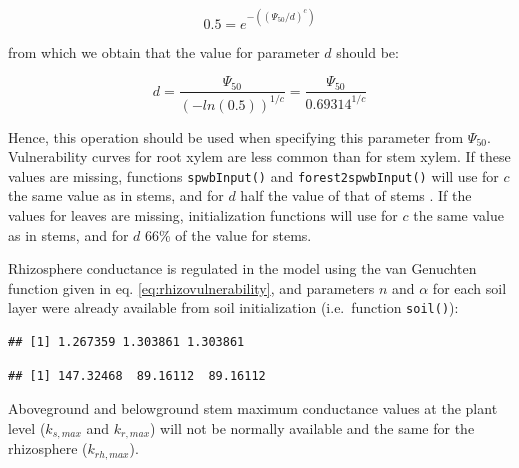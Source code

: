 \documentclass[]{book}
\newenvironment{Shaded}{\begin{snugshade}}{\end{snugshade}}
\newcommand{\KeywordTok}[1]{\textcolor[rgb]{0.13,0.29,0.53}{\textbf{#1}}}
\newcommand{\DecValTok}[1]{\textcolor[rgb]{0.00,0.00,0.81}{#1}}
\newcommand{\StringTok}[1]{\textcolor[rgb]{0.31,0.60,0.02}{#1}}
\newcommand{\OperatorTok}[1]{\textcolor[rgb]{0.81,0.36,0.00}{\textbf{#1}}}
\newcommand{\NormalTok}[1]{#1}
\begin{document}
\begin{equation}
0.5 = e^{-((\Psi_{50}/d)^c)}
\end{equation}

from which we obtain that the value for parameter \(d\) should be:

\begin{equation}
d = \frac{\Psi_{50}}{(-ln(0.5))^{1/c}}= \frac{\Psi_{50}}{0.69314^{1/c}}
\end{equation}

Hence, this operation should be used when specifying this parameter from
\(\Psi_{50}\). Vulnerability curves for root xylem are less common than
for stem xylem. If these values are missing, functions
\texttt{spwbInput()} and \texttt{forest2spwbInput()} will use for \(c\)
the same value as in stems, and for \(d\) half the value of that of
stems \citep{Sperry2016}. If the values for leaves are missing,
initialization functions will use for \(c\) the same value as in stems,
and for \(d\) 66\% of the value for stems.

Rhizosphere conductance is regulated in the model using the van
Genuchten function given in eq. \eqref{eq:rhizovulnerability}, and
parameters \(n\) and \(\alpha\) for each soil layer were already
available from soil initialization (i.e.~function \texttt{soil()}):

\begin{Shaded}
\end{Shaded}

\begin{verbatim}
## [1] 1.267359 1.303861 1.303861
\end{verbatim}

\begin{Shaded}
\end{Shaded}

\begin{verbatim}
## [1] 147.32468  89.16112  89.16112
\end{verbatim}

Aboveground and belowground stem maximum conductance values at the plant
level (\(k_{s, max}\) and \(k_{r, max}\)) will not be normally available
and the same for the rhizosphere (\(k_{rh, max}\)).
\end{document}
